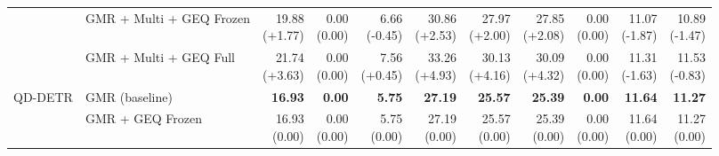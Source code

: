 \documentclass{article}
\begin{document}
{\begin{tabular}{llrrrrrrrrr}
 & GMR + Multi + GEQ Frozen & \shortstack{19.88 \\ {\scriptsize\textcolor{Gain}{(+1.77)}}} & \shortstack{0.00 \\ {\scriptsize\textcolor{Zero}{(0.00)}}} & \shortstack{6.66 \\ {\scriptsize\textcolor{Loss}{(-0.45)}}} & \shortstack{30.86 \\ {\scriptsize\textcolor{Gain}{(+2.53)}}} & \shortstack{27.97 \\ {\scriptsize\textcolor{Gain}{(+2.00)}}} & \shortstack{27.85 \\ {\scriptsize\textcolor{Gain}{(+2.08)}}} & \shortstack{0.00 \\ {\scriptsize\textcolor{Zero}{(0.00)}}} & \shortstack{11.07 \\ {\scriptsize\textcolor{Loss}{(-1.87)}}} & \shortstack{10.89 \\ {\scriptsize\textcolor{Loss}{(-1.47)}}} \\
 & GMR + Multi + GEQ Full & \shortstack{21.74 \\ {\scriptsize\textcolor{Gain}{(+3.63)}}} & \shortstack{0.00 \\ {\scriptsize\textcolor{Zero}{(0.00)}}} & \shortstack{7.56 \\ {\scriptsize\textcolor{Gain}{(+0.45)}}} & \shortstack{33.26 \\ {\scriptsize\textcolor{Gain}{(+4.93)}}} & \shortstack{30.13 \\ {\scriptsize\textcolor{Gain}{(+4.16)}}} & \shortstack{30.09 \\ {\scriptsize\textcolor{Gain}{(+4.32)}}} & \shortstack{0.00 \\ {\scriptsize\textcolor{Zero}{(0.00)}}} & \shortstack{11.31 \\ {\scriptsize\textcolor{Loss}{(-1.63)}}} & \shortstack{11.53 \\ {\scriptsize\textcolor{Loss}{(-0.83)}}} \\
\midrule
QD-DETR & GMR (baseline) & \textbf{16.93} & \textbf{0.00} & \textbf{5.75} & \textbf{27.19} & \textbf{25.57} & \textbf{25.39} & \textbf{0.00} & \textbf{11.64} & \textbf{11.27} \\
 & GMR + GEQ Frozen & \shortstack{16.93 \\ {\scriptsize\textcolor{Zero}{(0.00)}}} & \shortstack{0.00 \\ {\scriptsize\textcolor{Zero}{(0.00)}}} & \shortstack{5.75 \\ {\scriptsize\textcolor{Zero}{(0.00)}}} & \shortstack{27.19 \\ {\scriptsize\textcolor{Zero}{(0.00)}}} & \shortstack{25.57 \\ {\scriptsize\textcolor{Zero}{(0.00)}}} & \shortstack{25.39 \\ {\scriptsize\textcolor{Zero}{(0.00)}}} & \shortstack{0.00 \\ {\scriptsize\textcolor{Zero}{(0.00)}}} & \shortstack{11.64 \\ {\scriptsize\textcolor{Zero}{(0.00)}}} & \shortstack{11.27 \\ {\scriptsize\textcolor{Zero}{(0.00)}}} \\

\end{tabular}}
\end{document}

